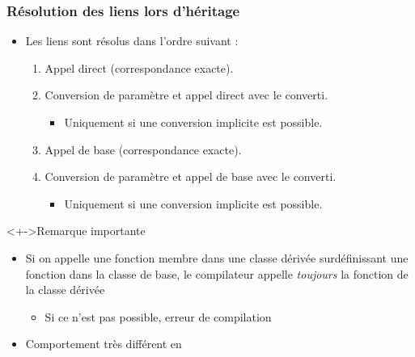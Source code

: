 \begin{frame}
\frametitle{Résolution des liens lors d'héritage}
\begin{itemize}[<+->]
\item Les liens sont résolus dans l'ordre suivant :
	\begin{enumerate}
	\item Appel direct (correspondance exacte).
	\item Conversion de paramètre et appel direct avec le converti.
		\begin{itemize}
		\item Uniquement si une conversion implicite est possible.
		\end{itemize}
	\item Appel de base (correspondance exacte).
	\item Conversion de paramètre et appel de base avec le converti.
		\begin{itemize}
		\item Uniquement si une conversion implicite est possible.
		\end{itemize}
	\end{enumerate}
\end{itemize}
\begin{alertblock}<+->{Remarque importante}
	\begin{itemize}[<+->]
	\item Si on appelle une fonction membre dans une classe dérivée surdéfinissant une fonction dans la classe de base, le compilateur appelle \emph{toujours} la fonction de la classe dérivée
		\begin{itemize}
		\item Si ce n'est pas possible, erreur de compilation
		\end{itemize}
	\end{itemize}
\end{alertblock}
\begin{itemize}[<+->]
\item Comportement très différent en \java
\end{itemize}
\end{frame}

